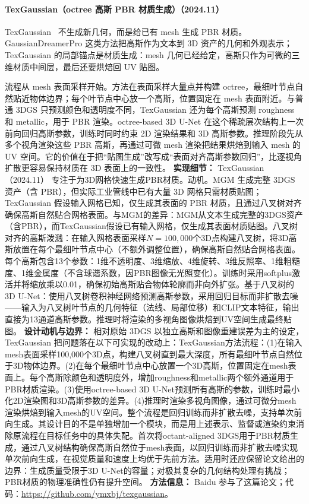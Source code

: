 \paragraph{TexGaussian（octree 高斯 PBR 材质生成）（2024.11）}
TexGaussian~\cite{2411_19654} 不生成新几何，而是给已有 mesh 生成 PBR 材质。GaussianDreamerPro 这类方法把高斯作为文本到 3D 资产的几何和外观表示；TexGaussian 的局部锚点是材质生成：mesh 几何已经给定，高斯只作为可微的三维材质中间层，最后还要烘焙回 UV 贴图。

流程从 mesh 表面采样开始。方法在表面采样大量点并构建 octree，最细叶节点自然贴近物体边界；每个叶节点中心放一个高斯，位置固定在 mesh 表面附近。与普通 3DGS 只预测颜色和透明度不同，TexGaussian 还为每个高斯预测 roughness 和 metallic，用于 PBR 渲染。octree-based 3D U-Net 在这个稀疏层次结构上一次前向回归高斯参数，训练时同时约束 2D 渲染结果和 3D 高斯参数。推理阶段先从多个视角渲染这些 PBR 高斯，再通过可微 mesh 渲染把结果烘焙到输入 mesh 的 UV 空间。它的价值在于把“贴图生成”改写成“表面对齐高斯参数回归”，比逐视角扩散更容易保持材质在 3D 表面上的一致性。
\textbf{实现细节：} TexGaussian（2024.11） 专注于为3D网格快速生成PBR材质。动机。MGM 生成完整 3DGS 资产（含 PBR），但实际工业管线中已有大量 3D 网格只需材质贴图；TexGaussian 假设输入网格已知，仅生成其表面的 PBR 材质，且通过八叉树对齐确保高斯自然贴合网格表面。与MGM的差异：MGM从文本生成完整的3DGS资产（含PBR），而TexGaussian假设已有输入网格，仅生成其表面材质贴图。八叉树对齐的高斯泼溅：在输入网格表面采样$N=100{,}000$个3D点构建八叉树，将3D高斯放置在每个最细叶节点中心（不额外调整位置），确保高斯自然贴合网格表面。每个高斯包含13个参数：1维不透明度、3维缩放、4维旋转、3维反照率、1维粗糙度、1维金属度（不含球谐系数，因PBR图像无光照变化）。训练时采用softplus激活并将缩放乘以0.01，确保初始高斯贴合物体轮廓而非向外扩张。基于八叉树的3D U-Net：使用八叉树卷积神经网络预测高斯参数，采用回归目标而非扩散去噪——输入为八叉树叶节点的几何特征（法线、局部位移）和CLIP文本特征，输出直接为13通道高斯参数。推理时将渲染的多视角图像烘焙到UV空间生成最终贴图。
\textbf{设计动机与边界：} 相对原始 3DGS 以独立高斯和图像重建误差为主的设定，TexGaussian 把问题落在以下可实现的改动上：TexGaussian方法流程：(1)在输入mesh表面采样100,000个3D点，构建八叉树直到最大深度，所有最细叶节点自然位于3D物体边界。(2)在每个最细叶节点中心放置一个3D高斯，位置固定在mesh表面上。每个高斯除颜色和透明度外，增加roughness和metallic两个额外通道用于PBR材质渲染。(3)使用octree-based 3D U-Net预测所有高斯的参数，训练时最小化2D渲染图和3D高斯参数的差异。(4)推理时渲染多视角图像，通过可微分mesh渲染烘焙到输入mesh的UV空间。整个流程是回归训练而非扩散去噪，支持单次前向生成。其设计目的不是单独增加一个模块，而是用上述表示、监督或渲染约束消除原流程在目标任务中的具体失配。首次将octant-aligned 3DGS用于PBR材质生成，通过八叉树结构确保高斯自然位于mesh表面，以回归训练而非扩散去噪实现单次前向生成，在视觉质量和速度上均优于先前方法。适用时还应保留论文给出的边界：生成质量受限于3D U-Net的容量；对极其复杂的几何结构处理有挑战；PBR材质的物理准确性仍有提升空间。
\textbf{方法信息：} Baidu 参与了这篇论文；代码：\url{https://github.com/ymxbj/texgaussian}。



